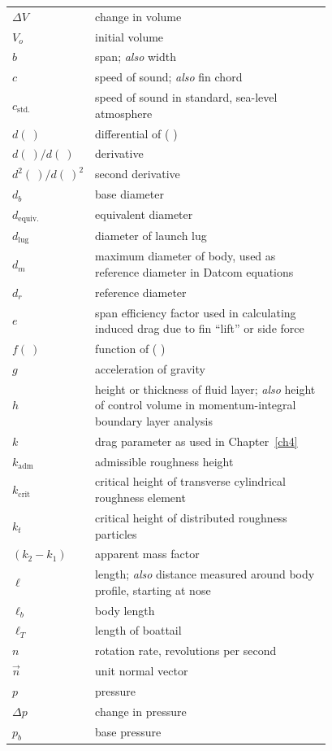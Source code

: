 \begin{longtable}{@{}l p{0.78\linewidth}@{}}
$\Delta V$ & change in volume \\
$V_o$ & initial volume \\
$b$ & span; \emph{also} width \\
$c$ & speed of sound; \emph{also} fin chord \\
$c_{\mathrm{std.}}$ & speed of sound in standard, sea-level atmosphere \\
$d(\ )$ & differential of ( ) \\
$d(\ )/d(\ )$ & derivative \\
$d^{2}(\ )/d(\ )^{2}$ & second derivative \\
$d_b$ & base diameter \\
$d_{\mathrm{equiv.}}$ & equivalent diameter \\
$d_{\mathrm{lug}}$ & diameter of launch lug \\
$d_m$ & maximum diameter of body, used as reference diameter in Datcom equations \\
$d_r$ & reference diameter \\
$e$ & span efficiency factor used in calculating induced drag due to fin ``lift'' or side force \\
$f(\ )$ & function of ( ) \\
$g$ & acceleration of gravity \\
$h$ & height or thickness of fluid layer; \emph{also} height of control volume in momentum-integral boundary layer analysis \\
$k$ & drag parameter as used in Chapter~\ref{ch4} \\
$k_{\mathrm{adm}}$ & admissible roughness height \\
$k_{\mathrm{crit}}$ & critical height of transverse cylindrical roughness element \\
$k_t$ & critical height of distributed roughness particles \\
$(k_2 - k_1)$ & apparent mass factor \\
$\ell$ & length; \emph{also} distance measured around body profile, starting at nose \\
$\ell_b$ & body length \\
$\ell_T$ & length of boattail \\
$n$ & rotation rate, revolutions per second \\
$\vec{n}$ & unit normal vector \\
$p$ & pressure \\
$\Delta p$ & change in pressure \\
$p_b$ & base pressure \\

\end{longtable}
